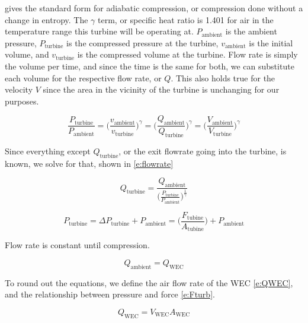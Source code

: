 \documentclass[conf]{new-aiaa}
\begin{document}
 gives the standard form for adiabatic compression, or compression done without a change in entropy.  The ${\gamma}$ term, or specific heat ratio is 1.401 for air in the temperature range this turbine will be operating at. $P_\text{ambient}$ is the ambient pressure, $P_\text{turbine}$ is the compressed pressure at the turbine, $v_\text{ambient}$ is the initial volume, and $v_\text{turbine}$ is the compressed volume at the turbine.  Flow rate is simply the volume per time, and since the time is the same for both, we can substitute each volume for the respective flow rate, or $Q$.  This also holds true for the velocity $V$ since the area in the vicinity of the turbine is unchanging for our purposes.

\begin{equation}
\label{e:compression}
\frac{P_\text{turbine}}{P_\text{ambient}} = \bigg(\frac{v_\text{ambient}}{v_\text{turbine}}\bigg)^\gamma = \bigg(\frac{Q_\text{ambient}}{Q_\text{turbine}}\bigg)^\gamma = \bigg(\frac{V_\text{ambient}}{V_\text{turbine}}\bigg)^\gamma
\end{equation}

Since everything except $Q_\text{turbine}$, or the exit flowrate going into the turbine, is known, we solve for that, shown in \cref{e:flowrate}

\begin{equation}
\label{e:flowrate}
Q_\text{turbine} = \frac{Q_\text{ambient}}{\bigg(\frac{P_\text{turbine}}{P_\text{ambient}}\bigg)^\frac{1}{\gamma}}
\end{equation}

\begin{equation}
\label{e:Pcompressed}
P_\text{turbine} = \Delta P_\text{turbine} + P_\text{ambient} = \bigg(\frac{F_\text{tubine}} {A_\text{tubine}}\bigg) + P_\text{ambient} 
\end{equation}


Flow rate is constant until compression.

\begin{equation}
\label{e:Qambient}
Q_\text{ambient} = Q_\text{WEC}
\end{equation}

To round out the equations, we define the air flow rate of the WEC \cref{e:QWEC}, and the relationship between pressure and force \cref{e:Fturb}.

\begin{equation}
\label{e:QWEC}
Q_\text{WEC} = V_\text{WEC} A_\text{WEC}
\end{equation}
\end{document}

